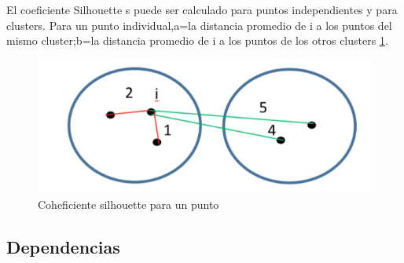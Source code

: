 \documentclass[10pt,a4paper]{article}
\begin{document}
El coeficiente Silhouette s puede ser calculado para puntos independientes y para clusters. Para un punto individual,a=la distancia promedio de i a los puntos del mismo cluster;b=la distancia promedio de i a los puntos de los otros clusters \ref{fig:coeficiente}.

\begin{figure}[H]
	\centering
	\includegraphics[scale=0.50]{./img/silhouette01.png}%
	\caption[Coeficiente silhouette para un punto i]{Coheficiente silhouette para un punto}
	\label{fig:coeficiente}
\end{figure}

\newpage

\subsection*{Dependencias}
\end{document}
